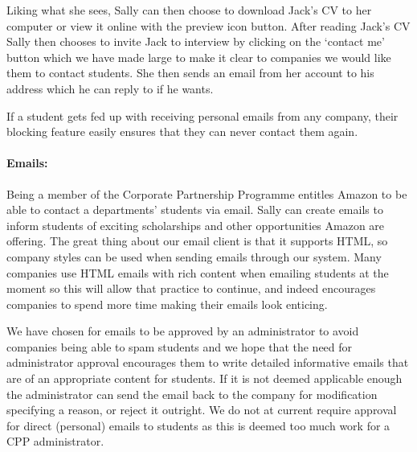     Liking what she sees, Sally can then choose to download Jack's CV to her computer or view it online with the preview icon button. After reading Jack's CV Sally then chooses to invite Jack to interview by clicking on the `contact me' button which we have made large to make it clear to companies we would like them to contact students. She then sends an email from her account to his address which he can reply to if he wants.

    If a student gets fed up with receiving personal emails from any company, their blocking feature easily ensures that they can never contact them again.

  \paragraph{Emails:}
    Being a member of the Corporate Partnership Programme entitles Amazon to be able to contact a departments' students via email. Sally can create emails to inform students of exciting scholarships and other opportunities Amazon are offering. The great thing about our email client is that it supports HTML, so company styles can be used when sending emails through our system. Many companies use HTML emails with rich content when emailing students at the moment so this will allow that practice to continue, and indeed encourages companies to spend more time making their emails look enticing.

    We have chosen for emails to be approved by an administrator to avoid companies being able to spam students and we hope that the need for administrator approval encourages them to write detailed informative emails that are of an appropriate content for students. If it is not deemed applicable enough the administrator can send the email back to the company for modification specifying a reason, or reject it outright.
    We do not at current require approval for direct (personal) emails to students as this is deemed too much work for a CPP administrator.


